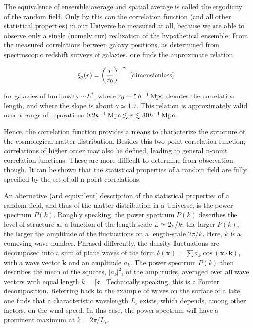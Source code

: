 \documentclass[a4paper,11pt]{article}
\begin{document}
{\noindent}The equivalence of ensemble average and spatial average is called the ergodicity of the random field. Only by this can the correlation function (and all other statistical properties) in our Universe be measured at all, because we are able to observe only a single (namely our) realization of the hypothetical ensemble. From the measured correlations between galaxy positions, as determined from spectroscopic redshift surveys of galaxies, one finds the approximate relation

\begin{align*}
    \xi_g(r) = \left(\frac{r}{r_0}\right)^{-\gamma} ~ [{\rm dimensionless}],
\end{align*}

{\noindent}for galaxies of luminosity $\sim L^*$, where $r_0\sim5\,h^{-1}\,{\rm Mpc}$ denotes the correlation length, and where the slope is about $\gamma\simeq1.7$. This relation is approximately valid over a range of separations $0.2h^{-1}\,{\rm Mpc}\lesssim r \lesssim 30h^{-1}\,{\rm Mpc}$.

{\noindent}Hence, the correlation function provides a means to characterize the structure of the cosmological matter distribution. Besides this two-point correlation function, correlations of higher order may also be defined, leading to general n-point correlation functions. These are more difficult to determine from observation, though. It can be shown that the statistical properties of a random field are fully specified by the set of all n-point correlations.

{\noindent}An alternative (and equivalent) description of the statistical properties of a random field, and thus of the matter distribution in a Universe, is the power spectrum $P(k)$. Roughly speaking, the power spectrum $P(k)$ describes the level of structure as a function of the length-scale $L\simeq2\pi/k$; the larger $P(k)$, the larger the amplitude of the fluctuations on a length-scale $2\pi/k$. Here, $k$ is a comoving wave number. Phrased differently, the density fluctuations are decomposed into a sum of plane waves of the form $\delta(\mathbf{x})=\sum a_k\cos(\mathbf{x}\cdot\mathbf{k})$, with a wave vector $\mathbf{k}$ and an amplitude $a_k$. The power spectrum $P(k)$ then describes the mean of the squares, $\lvert a_k\rvert^2$, of the amplitudes, averaged over all wave vectors with equal length $k=\lvert\mathbf{k}\lvert$. Technically speaking, this is a Fourier decomposition. Referring back to the example of waves on the surface of a lake, one finds that a characteristic wavelength $L_c$ exists, which depends, among other factors, on the wind speed. In this case, the power spectrum will have a prominent maximum at $k=2\pi/L_c$.
\end{document}
